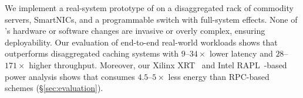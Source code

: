 We implement a real-system prototype of \name on a disaggregated rack of commodity servers, SmartNICs, and a programmable switch with full-system effects. None of \name's hardware or software changes are invasive or overly complex, ensuring deployability.  Our evaluation of end-to-end real-world workloads shows that \name outperforms disaggregated caching systems with $9$--$34\times$ lower latency and $28$--$171\times$ higher throughput. Moreover, our Xilinx XRT~\cite{xilinx_xrt} and Intel RAPL~\cite{intel_rapl}-based power analysis shows that \name consumes $4.5$--$5\times$ less energy than RPC-based schemes (\S\ref{sec:evaluation}). %


